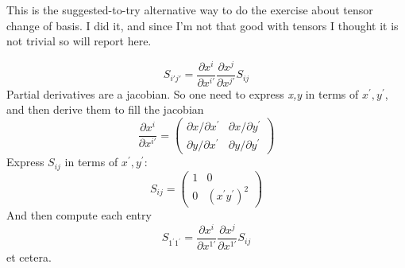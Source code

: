 This is the suggested-to-try alternative way to do the exercise about tensor change of basis. I did it, and since I'm not that good with tensors I thought it is not trivial so will report here.\par
\[
S_{i\prime j\prime } = \frac{\partial x^{i}}{\partial x^{i\prime }} \frac{\partial x^{j}}{\partial x^{j\prime }} S_{ij}
\]
Partial derivatives are a jacobian. So one need to express \emph{x,y} in terms of $x^{\prime },y^{\prime }$, and then derive them to fill the jacobian
\begin{equation}
\frac{\partial x^{i}}{\partial x^{i\prime }}  = \begin{pmatrix}
\partial x /\partial x^{\prime } & \partial x / \partial y^{\prime } \\
\partial y / \partial x^{\prime } & \partial y / \partial y^{\prime }
\end{pmatrix} 
\end{equation}
Express $S_{ij}$ in terms of $x^{\prime }, y^{\prime }$:
\[
S_{ij} = \begin{pmatrix}
1 & 0 \\
0 & \left( x^{\prime }y^{\prime } \right)^{2}
\end{pmatrix} 
\]
And then compute each entry
\[
S_{1^{\prime }1^{\prime }} = \frac{\partial x^{i}}{\partial x^{1\prime }} \frac{\partial x^{j}}{\partial x^{1\prime }} S_{ij} 
\]
et cetera. 


